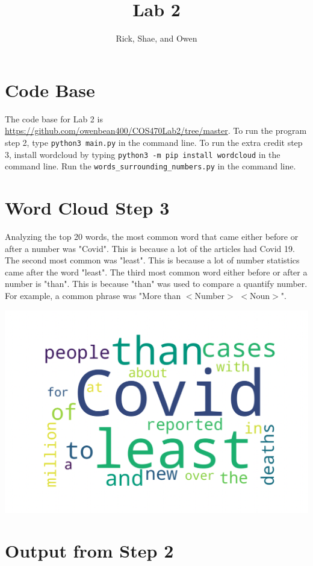 \documentclass{article}
\title{Lab 2}
\author{Rick, Shae, and Owen}
\begin{document}
\maketitle

\section{Code Base}

The code base for Lab 2 is \href{https://github.com/owenbean400/COS470Lab2/tree/master}{https://github.com/owenbean400/COS470Lab2/tree/master}. To run the program step 2, type \verb|python3 main.py| in the command line. To run the extra credit step 3, install wordcloud by typing \verb|python3 -m pip install wordcloud| in the command line. Run the \verb|words_surrounding_numbers.py| in the command line.

\section{Word Cloud Step 3}

Analyzing the top 20 words, the most common word that came either before or after a number was "Covid". This is because a lot of the articles had Covid 19. The second most common was "least". This is because a lot of number statistics came after the word "least". The third most common word either before or after a number is "than". This is because "than" was used to compare a quantify number. For example, a common phrase was "More than $<$Number$>$  $<$Noun$>$".

\includegraphics[width=\textwidth]{wordcloud.png}

\section{Output from Step 2}


\end{document}
